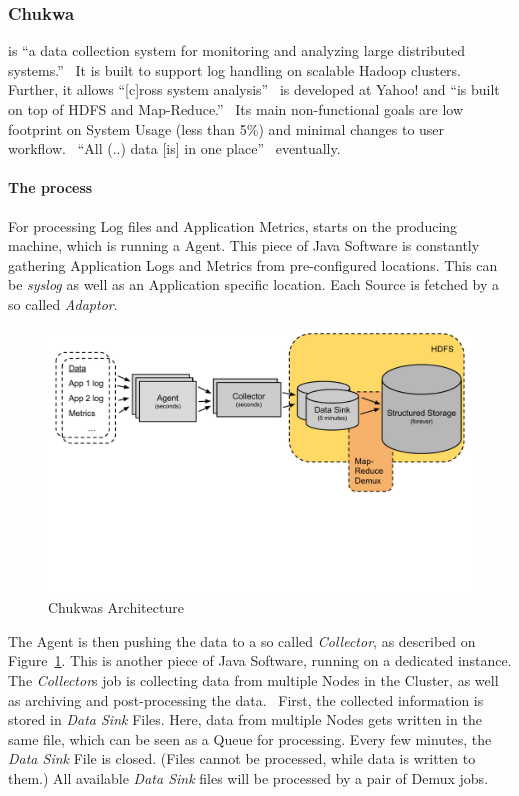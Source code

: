 \subsubsection{Chukwa}
\chuklong is ``a data collection system for monitoring and analyzing large distributed systems.''~\cite{Boulona}
It is built to support log handling on scalable Hadoop clusters. 
Further, it allows ``[c]ross system analysis''~\cite{ChukwaPoster} 
\chuk is developed at Yahoo! and ``is built on top of HDFS and Map-Reduce.''~\cite{Rabkin2008a}
Its main non-functional goals are low footprint on System Usage (less than 5\%) and minimal changes to user workflow.~\cite{Rabkin2010}
``All (..) data [is] in one place''~\cite{ChukwaPoster} eventually.

\paragraph{The process}
For processing Log files and Application Metrics, \chuk starts on the producing machine, which is running a \chuk Agent. 
This piece of Java Software is constantly gathering Application Logs and Metrics from pre-configured locations. 
This can be \textit{syslog} as well as an Application specific location. 
Each Source is fetched by a so called \textit{Adaptor}.~\cite{ChukwaAdminAgent}

\begin{figure}
  \centering
  \includegraphics[width=\linewidth,clip=true,trim=0 6cm 0 0]{images/ChukwaArchitecture}
  \caption{Chukwas Architecture~\cite{Rabkin2008}}
  \label{fig:ChukwaArchitecture}
\end{figure}

The Agent is then pushing the data to a so called \textit{Collector}, as described on Figure~\ref{fig:ChukwaArchitecture}.
This is another piece of Java Software, running on a dedicated \chuk instance. 
The \textit{Collector}s job is collecting data from multiple Nodes in the Cluster, as well as archiving and post-processing the data.~\cite{Jose2014}
First, the collected information is stored in \textit{Data Sink} Files. 
Here, data from multiple Nodes gets written in the same file, which can be seen as a Queue for processing.
Every few minutes, the \textit{Data Sink} File is closed. (Files cannot be processed, while data is written to them.)
All available \textit{Data Sink} files will be processed by a pair of Demux \mr jobs.~\cite{Boulona} 


